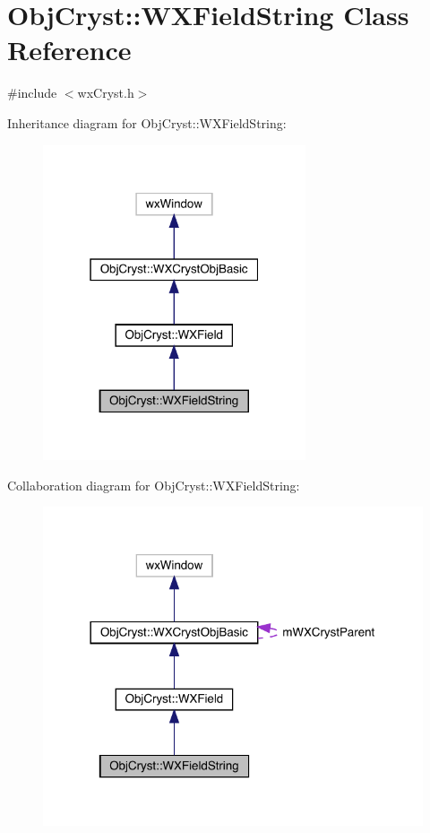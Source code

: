 \hypertarget{class_obj_cryst_1_1_w_x_field_string}{}\section{Obj\+Cryst\+::W\+X\+Field\+String Class Reference}
\label{class_obj_cryst_1_1_w_x_field_string}


{\ttfamily \#include $<$wx\+Cryst.\+h$>$}



Inheritance diagram for Obj\+Cryst\+::W\+X\+Field\+String\+:
\nopagebreak
\begin{figure}[H]
\begin{center}
\leavevmode
\includegraphics[width=220pt]{class_obj_cryst_1_1_w_x_field_string__inherit__graph}
\end{center}
\end{figure}


Collaboration diagram for Obj\+Cryst\+::W\+X\+Field\+String\+:
\nopagebreak
\begin{figure}[H]
\begin{center}
\leavevmode
\includegraphics[width=318pt]{class_obj_cryst_1_1_w_x_field_string__coll__graph}
\end{center}
\end{figure}
